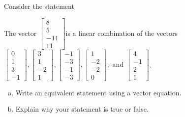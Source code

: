 
\begin{exerciseStatement}


Consider the statement 
\begin{center}\begin{minipage}{0.8\textwidth}
 The vector \( \left[\begin{array}{c}
8 \\
5 \\
-11 \\
11
\end{array}\right] \)is a linear combination of the vectors \( \left[\begin{array}{c}
0 \\
1 \\
3 \\
-1
\end{array}\right] , \left[\begin{array}{c}
3 \\
1 \\
-2 \\
1
\end{array}\right] , \left[\begin{array}{c}
-1 \\
-3 \\
-1 \\
-3
\end{array}\right] , \left[\begin{array}{c}
1 \\
-2 \\
-2 \\
0
\end{array}\right] , \text{ and } \left[\begin{array}{c}
4 \\
-1 \\
2 \\
1
\end{array}\right] \). 
\end{minipage}\end{center}
    


\begin{enumerate}[(a)]
\item  Write an equivalent statement using a vector equation.
\item  Explain why your statement is true or false.
\end{enumerate}
    
\end{exerciseStatement}
    
